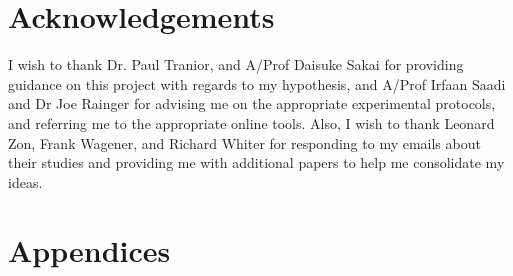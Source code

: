\documentclass[12pt]{article}
\begin{document}
\section{Acknowledgements}
I wish to thank Dr. Paul Tranior, and A/Prof Daisuke Sakai for providing guidance on this project with regards to my hypothesis, and A/Prof Irfaan Saadi and Dr Joe Rainger for advising me on the appropriate experimental protocols, and referring me to the appropriate online tools. Also, I wish to thank Leonard Zon, Frank Wagener, and Richard Whiter for responding to my emails about their studies and providing me with additional papers to help me consolidate my ideas. 


\section{Appendices}
\appendix
\end{document}
